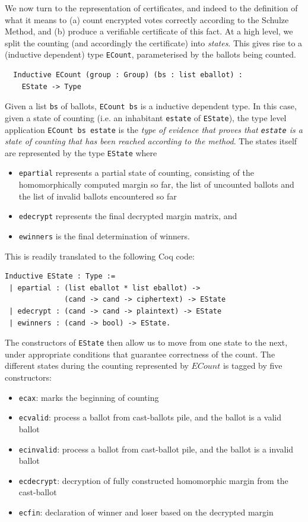  We now turn to the representation of certificates, and indeed to the
  definition of what it means to (a) count encrypted votes correctly
  according to the Schulze Method, and (b) produce a verifiable
  certificate of this fact. At a high level, we split the counting
  (and accordingly the certificate) into \emph{states}. This gives
  rise to a (inductive dependent) type \texttt{ECount}, parameterised
  by the ballots being counted.

  \begin{verbatim}
  Inductive ECount (group : Group) (bs : list eballot) : 
    EState -> Type
  \end{verbatim}

  \noindent
  Given a list \texttt{bs} of ballots, \texttt{ECount bs} is a
  inductive dependent type. In this case, given a state of counting
  (i.e. an inhabitant \texttt{estate} of \texttt{EState}), the type level application
  \texttt{ECount bs estate} is the \emph{type of evidence that proves
  that \texttt{estate} is a state of counting that has been reached
  according to the method}.  The states itself are represented by
  the type \texttt{EState}
where
\begin{itemize}
 \item \texttt{epartial} represents a partial state of counting,
 consisting of the homomorphically computed margin so far, the list
 of uncounted ballots and the list of invalid ballots encountered so
 far
 \item \texttt{edecrypt} represents the final decrypted margin
 matrix, and 
 \item \texttt{ewinners} is the final determination of winners. 
\end{itemize}
This is readily translated to the following Coq code:
 
\begin{verbatim}
Inductive EState : Type :=
 | epartial : (list eballot * list eballot) ->
              (cand -> cand -> ciphertext) -> EState
 | edecrypt : (cand -> cand -> plaintext) -> EState
 | ewinners : (cand -> bool) -> EState.
\end{verbatim}




\noindent
The constructors of \texttt{EState} then allow us to move from one
state to the next, under appropriate conditions that guarantee
correctness of the count. The different states during the 
counting represented by $ECount$ is tagged by five constructors: 
\begin{itemize}
\item \texttt{ecax}: marks the beginning of counting
\item \texttt{ecvalid}: process a ballot from cast-ballots pile, and the ballot is a valid ballot
\item \texttt{ecinvalid}: process a ballot from cast-ballot pile, and the ballot is a invalid ballot
\item \texttt{ecdecrypt}: decryption of fully constructed homomorphic margin from the cast-ballot
\item \texttt{ecfin}: declaration of winner and loser based on the decrypted margin
\end{itemize}

